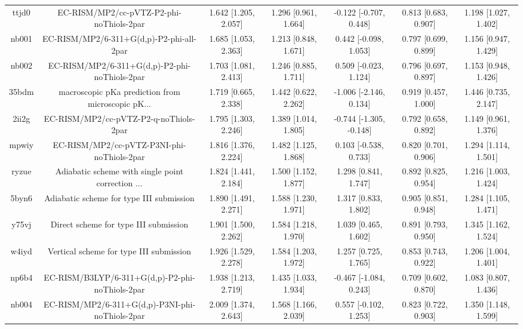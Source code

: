 \documentclass{article}
\begin{document}
\begin{center}
\begin{longtable}{|ccccccc|}
 ttjd0 &           EC-RISM/MP2/cc-pVTZ-P2-phi-noThiols-2par &  1.642 [1.205, 2.057] &  1.296 [0.961, 1.664] &   -0.122 [-0.707, 0.448] &  0.813 [0.683, 0.907] &   1.198 [1.027, 1.402] \\
 nb001 &           EC-RISM/MP2/6-311+G(d,p)-P2-phi-all-2par &  1.685 [1.053, 2.363] &  1.213 [0.848, 1.671] &    0.442 [-0.098, 1.053] &  0.797 [0.699, 0.899] &   1.156 [0.947, 1.429] \\
 nb002 &      EC-RISM/MP2/6-311+G(d,p)-P2-phi-noThiols-2par &  1.703 [1.081, 2.413] &  1.246 [0.885, 1.711] &    0.509 [-0.023, 1.124] &  0.796 [0.697, 0.897] &   1.153 [0.948, 1.426] \\
 35bdm &  macroscopic pKa prediction from microscopic pK... &  1.719 [0.665, 2.338] &  1.442 [0.622, 2.262] &   -1.006 [-2.146, 0.134] &  0.919 [0.457, 1.000] &   1.446 [0.735, 2.147] \\
 2ii2g &             EC-RISM/MP2/cc-pVTZ-P2-q-noThiols-2par &  1.795 [1.303, 2.246] &  1.389 [1.014, 1.805] &  -0.744 [-1.305, -0.148] &  0.792 [0.658, 0.892] &   1.149 [0.961, 1.376] \\
 mpwiy &         EC-RISM/MP2/cc-pVTZ-P3NI-phi-noThiols-2par &  1.816 [1.376, 2.224] &  1.482 [1.125, 1.868] &    0.103 [-0.538, 0.733] &  0.820 [0.701, 0.906] &   1.294 [1.114, 1.501] \\
 ryzue &  Adiabatic scheme with single point correction ... &  1.824 [1.441, 2.184] &  1.500 [1.152, 1.877] &     1.298 [0.841, 1.747] &  0.892 [0.825, 0.954] &   1.216 [1.003, 1.424] \\
 5byn6 &           Adiabatic scheme for type III submission &  1.890 [1.491, 2.271] &  1.588 [1.230, 1.971] &     1.317 [0.833, 1.802] &  0.905 [0.851, 0.948] &   1.284 [1.105, 1.471] \\
 y75vj &              Direct scheme for type III submission &  1.901 [1.500, 2.262] &  1.584 [1.218, 1.970] &     1.039 [0.465, 1.602] &  0.891 [0.793, 0.950] &   1.345 [1.162, 1.524] \\
 w4iyd &            Vertical scheme for type III submission &  1.926 [1.529, 2.278] &  1.584 [1.203, 1.972] &     1.257 [0.725, 1.765] &  0.853 [0.743, 0.922] &   1.206 [1.004, 1.401] \\
 np6b4 &    EC-RISM/B3LYP/6-311+G(d,p)-P2-phi-noThiols-2par &  1.938 [1.213, 2.719] &  1.435 [1.033, 1.934] &   -0.467 [-1.084, 0.243] &  0.709 [0.602, 0.870] &   1.083 [0.807, 1.436] \\
 nb004 &    EC-RISM/MP2/6-311+G(d,p)-P3NI-phi-noThiols-2par &  2.009 [1.374, 2.643] &  1.568 [1.166, 2.039] &    0.557 [-0.102, 1.253] &  0.823 [0.722, 0.903] &   1.350 [1.148, 1.599] \\

\end{longtable}
\end{center}
\end{document}
